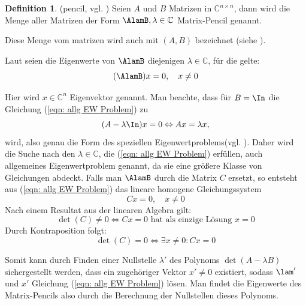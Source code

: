 \documentclass[a4paper,12pt]{report}
\newcommand{\C}{\mathbb C}
\newcommand{\zitat}[1]{\glqq #1\grqq}
\newcommand{\1}{\mathds{1}}
\theoremstyle{plain} %
\theoremstyle{definition} %
\newtheorem{definition}[theorem]{Definition}
\theoremstyle{remark}
\begin{document}
            \begin{definition}(pencil, vgl. \cite[S. 375]{matrixGolub})
                  \label{def: pencil}
                  Seien $A$ und $B$ Matrizen in $\C^{n\times n}$, dann wird die Menge aller Matrizen der Form
                  $\AlamB, \lambda \in \C$ Matrix-Pencil genannt.
            \end{definition}

            Diese Menge vom matrizen wird auch mit $(A, B)$ bezeichnet (siehe \cite[S. 37w]{regularMatrixPencil}).

            Laut \cite[S. 375]{matrixGolub} seien die Eigenwerte von $\AlamB$ diejenigen $\lambda \in\C$, für die gelte:
            \begin{equation}
                  \label{eqn: allg EW Problem}
                  (\AlamB)x=0,\quad x\ne 0
            \end{equation}
            
            Hier wird $x\in\C^n$ Eigenvektor genannt.
            Man beachte, dass für $B=\In$ die Gleichung (\ref{eqn: allg EW Problem}) zu
            $$(A-\lambda\In)x=0 \Leftrightarrow Ax = \lambda x,$$
            wird, also genau die Form des \zitat{speziellen Eigenwertproblems}(vgl. \cite[S. 381]{maschinendynamikDresig}).
            Daher wird die Suche nach den $\lambda\in\C$, die (\ref{eqn: allg EW Problem}) erfüllen,
            auch \zitat{allgemeines Eigenwertproblem}\cite[S. 380]{maschinendynamikDresig} genannt, da sie eine größere Klasse von Gleichungen abdeckt.
            Falls man $\AlamB$ durch die Matrix $C$ ersetzt, so entsteht aus (\ref{eqn: allg EW Problem}) das lineare homogene Gleichungssystem
            $$Cx=0,\quad x\ne 0$$
            Nach einem Resultat aus der linearen Algebra gilt:
            $$\det(C)\ne 0 \Leftrightarrow Cx=0 \text{ hat als einzige Lösung }x=0$$
            Durch Kontraposition folgt:
            $$\det(C)=0 \Leftrightarrow \exists x\ne 0: Cx=0$$

            
            Somit kann durch Finden einer Nullstelle $\lambda'$ des Polynoms $\det(A-\lambda B)$ sichergestellt werden, dass ein zugehöriger Vektor $x'\ne 0$ existiert,
            sodass $\lam'$ und $x'$ Gleichung (\ref{eqn: allg EW Problem}) lösen.
            Man findet die Eigenwerte des Matrix-Pencils also durch die Berechnung der Nullstellen dieses Polynoms.
\end{document}
